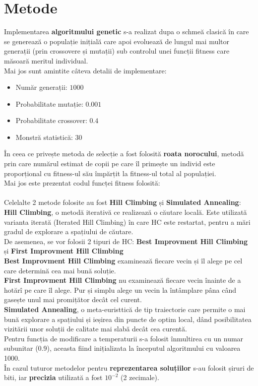 \documentclass{article}
\begin{document}
\section{Metode}
Implementarea \textbf{algoritmului genetic} s-a realizat dupa o schmeă clasică în care se generează o populație inițială care apoi evoluează de lungul mai multor generații (prin crossovere și mutații) sub controlul unei funcții fitness care măsoară meritul individual.\\
Mai jos sunt amintite câteva detalii de implementare:
\begin{itemize}
\item Număr generații: $1000$
\item Probabilitate mutație: $0.001$
\item Probabilitate crossover: $0.4$
\item Monstră statistică: $30$
\end{itemize}
În ceea ce privește metoda de selecție a fost folosită \textbf{roata norocului}, metodă prin care numărul estimat de copii pe care îl primește un individ este proporțional cu fitness-ul său împărțit la fitness-ul total al populației.\\ 
Mai jos este prezentat codul funcței fitness folosită:\\ \\
Celelalte 2 metode folosite au fost \textbf{Hill Climbing} și \textbf{Simulated Annealing}:\\
\textbf{Hill Climbing}, o metodă iterativă ce realizează o căutare locală. Este utilizată varianta iterată (Iterated Hill Climbing) în care HC este restartat, pentru a mări gradul de explorare a spațiului de căutare.\\
De asemenea, se vor folosii 2 tipuri de HC:  \textbf{Best Improvment Hill Climbing} și \textbf{First Improvment Hill Climbing}\\
\textbf{Best Improvment Hill Climbing} examinează fiecare vecin și îl alege pe cel care determină cea mai bună soluție.\\
\textbf{First Improvment Hill Climbing} nu examinează fiecare vecin înainte de a hotărî pe care îl alege. Pur și simplu alege un vecin la întâmplare pâna când gasește unul mai promițător decât cel curent.\\
\textbf{Simulated Annealing}, o meta-euristtică de tip traiectorie care permite o mai bună explorare a spațiului 
și ieșirea din puncte de optim local, dând posibilitatea vizitării unor soluții de calitate mai slabă decât cea curentă. \\
Pentru funcția de modificare a temperaturii s-a folosit înmultirea cu un numar subunitar (0.9), aceasta fiind inițializata la începutul algoritmului cu valoarea 1000.\\
În cazul tuturor metodelor pentru \textbf{reprezentarea soluțiilor} s-au folosit șiruri de biti, iar \textbf{precizia} utilizată a fost $10^{-2}$ (2 zecimale).
\end{document}
